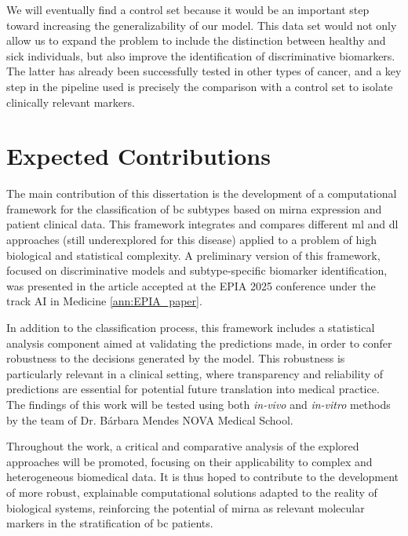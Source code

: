 We will eventually find a control set because it would be an important step
toward increasing the generalizability of our model. This data set would not
only allow us to expand the problem to include the distinction between healthy
and sick individuals, but also improve the identification of discriminative
biomarkers. The latter has already been successfully tested in other types of
cancer, and a key step in the pipeline used is precisely the comparison with a
control set \cite{ml_gastric_Azari2023} to isolate clinically relevant markers.

\section{Expected Contributions}
\label{sec:expected-contributions}
The main contribution of this dissertation is the development of a computational
framework for the classification of \gls{bc} subtypes based
on \gls{mirna} expression and patient clinical data. This
framework integrates and compares different \gls{ml} and
\gls{dl} approaches (still underexplored for this disease)
applied to a problem of high biological and statistical complexity.
A preliminary version of this framework, focused on discriminative models and
subtype-specific biomarker identification, was presented in the article accepted
at the EPIA 2025 conference under the track AI in Medicine \ref{ann:EPIA_paper}.

In addition to the classification process, this framework includes a
statistical analysis component aimed at validating the predictions made, in
order to confer robustness to the decisions generated by the model. This
robustness is particularly relevant in a clinical setting, where transparency
and reliability of predictions are essential for potential future translation
into medical practice. The findings of this work will be tested using both
\textit{in-vivo} and \textit{in-vitro} methods by the team of Dr. Bárbara
Mendes \+ NOVA Medical School.

Throughout the work, a critical and comparative analysis of the explored
approaches will be promoted, focusing on their applicability to complex and
heterogeneous biomedical data. It is thus hoped to contribute to the
development of more robust, explainable computational solutions adapted to the
reality of biological systems, reinforcing the potential of \gls{mirna} as
relevant molecular markers in the stratification of \gls{bc} patients.

